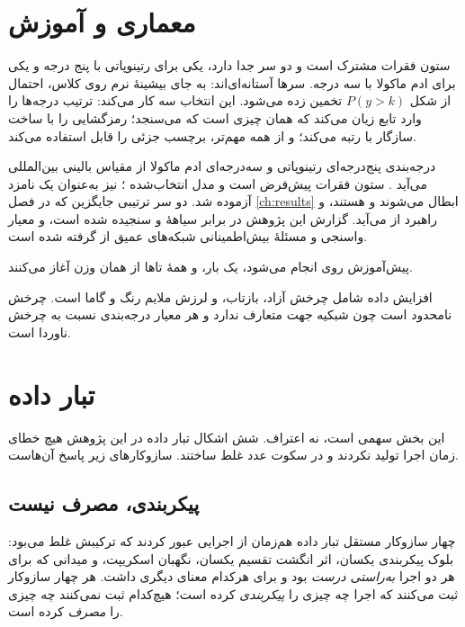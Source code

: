 \section{معماری و آموزش}

ستون فقرات مشترک است و دو سر جدا دارد، یکی برای رتینوپاتی با پنج درجه و یکی برای ادم ماکولا با
سه درجه. سرها آستانه‌ای‌اند: به جای بیشینهٔ نرم روی  کلاس،  احتمال از شکل
$P(y>k)$ تخمین زده می‌شود. این انتخاب سه کار می‌کند: ترتیب درجه‌ها را وارد تابع زیان می‌کند
که همان چیزی است که  می‌سنجد؛ رمزگشایی را با ساخت سازگار با رتبه می‌کند؛ و از همه
مهم‌تر، برچسب جزئی  را قابل استفاده می‌کند.

درجه‌بندی پنج‌درجه‌ای رتینوپاتی و سه‌درجه‌ای ادم ماکولا از مقیاس بالینی بین‌المللی
می‌آید \cite{wilkinson2003scale}. ستون فقرات پیش‌فرض 
\cite{huang2017densenet} است و مدل انتخاب‌شده 
\cite{tan2019efficientnet}؛  \cite{liu2022convnext} نیز به‌عنوان یک نامزد
آزموده شد. دو سر ترتیبی جایگزین که در فصل \ref{ch:results} ابطال می‌شوند
 \cite{cao2020rank} و  \cite{shi2023corn} هستند، و راهبرد
 از \cite{kumar2022lpft} می‌آید. گزارش این پژوهش در برابر سیاههٔ
 \cite{mongan2020claim} و  \cite{collins2015tripod} سنجیده شده است، و
معیار واسنجی و مسئلهٔ بیش‌اطمینانی شبکه‌های عمیق از \cite{guo2017calibration} گرفته شده است.

پیش‌آموزش روی  \cite{eyepacs2015} انجام می‌شود، یک بار، و همهٔ تاها از همان وزن
آغاز می‌کنند.

افزایش داده شامل چرخش آزاد، بازتاب، و لرزش ملایم رنگ و گاما است. چرخش نامحدود است چون شبکیه
جهت متعارف ندارد و هر معیار درجه‌بندی نسبت به چرخش ناوردا است.

\section{تبار داده}
\label{sec:provenance}

این بخش سهمی است، نه اعتراف. شش اشکال تبار داده در این پژوهش هیچ خطای زمان اجرا تولید نکردند و
در سکوت عدد غلط ساختند. سازوکارهای زیر پاسخ آن‌هاست.

\subsection{پیکربندی، مصرف نیست}

چهار سازوکار مستقل تبار داده هم‌زمان از اجرایی عبور کردند که ترکیبش غلط می‌بود: بلوک پیکربندی
یکسان، اثر انگشت تقسیم یکسان، نگهبان اسکریپت، و میدانی که برای هر دو اجرا \emph{به‌راستی درست}
بود و برای هرکدام معنای دیگری داشت. هر چهار سازوکار ثبت می‌کنند که اجرا چه چیزی را
\emph{پیکربندی} کرده است؛ هیچ‌کدام ثبت نمی‌کنند چه چیزی را \emph{مصرف} کرده است.


